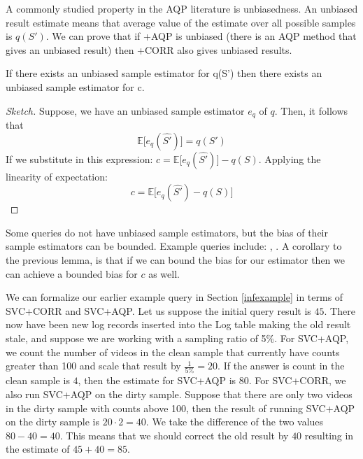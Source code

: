 A commonly studied property in the AQP literature is unbiasedness.
An unbiased result estimate means that average value of the estimate over all possible samples is $q(S')$.
We can prove that if \svcnospace+AQP is unbiased (there is an AQP method that gives an unbiased result) then \svcnospace+CORR also gives unbiased results.
\begin{lemma}\label{lemma:unbiased}
If there exists an unbiased sample estimator for q(S') then there exists an unbiased sample estimator for c.
\end{lemma}
\begin{proof}[Sketch] 
Suppose, we have an unbiased sample estimator $e_q$ of $q$. 
Then, it follows that \[\mathbb{E}\big[e_q(\hat{S'})\big] = q(S')\]
If we substitute in this expression:
$c = \mathbb{E}\big[e_q(\hat{S'})\big] - q(S) $.
Applying the linearity of expectation:
\[ c = \mathbb{E}\big[e_q(\hat{S'}) - q(S)\big] \]
\end{proof}
Some queries do not have unbiased sample estimators, but the bias of their sample estimators can be bounded. Example queries include: \medfunc, \percfunc.
A corollary to the previous lemma, is that if we can bound the bias for our estimator then we can achieve a bounded bias for $c$ as well.


\begin{example}
We can formalize our earlier example query in Section \ref{infexample} in terms of SVC+CORR and SVC+AQP.
Let us suppose the initial query result is $45$.
There now have been new log records inserted into the Log table making the old result stale, and suppose we are working with a sampling ratio of 5\%.
For SVC+AQP, we count the number of videos in the clean sample that currently have counts greater than 100 and scale that result by $\frac{1}{5\%} = 20$. 
If the answer is count in the clean sample is $4$, then the estimate for SVC+AQP is $80$.
For SVC+CORR, we also run SVC+AQP on the dirty sample.
Suppose that there are only two videos in the dirty sample with counts above 100, then the result of running SVC+AQP on the dirty sample is $20\cdot2 = 40$.
We take the difference of the two values $80 - 40 = 40$.
This means that we should correct the old result by $40$ resulting in the estimate of $45+40 = 85$.
\end{example}

